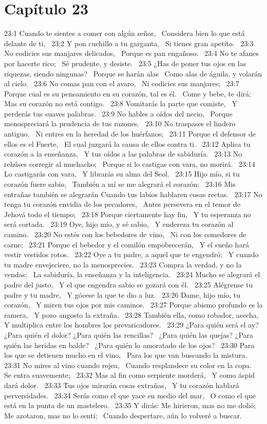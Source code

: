 \section*{Capítulo 23 }

23:1 Cuando te sientes a comer con algún señor,  
Considera bien lo que está delante de ti,  
23:2 Y pon cuchillo a tu garganta,  
Si tienes gran apetito.  
23:3 No codicies sus manjares delicados,  
Porque es pan engañoso.  
23:4 No te afanes por hacerte rico;  
Sé prudente, y desiste.  
23:5 ¿Has de poner tus ojos en las riquezas, siendo ningunas?  
Porque se harán alas  
Como alas de águila, y volarán al cielo.  
23:6 No comas pan con el avaro,  
Ni codicies sus manjares;  
23:7 Porque cual es su pensamiento en su corazón, tal es él.  
Come y bebe, te dirá;  
Mas su corazón no está contigo.  
23:8 Vomitarás la parte que comiste,  
Y perderás tus suaves palabras.  
23:9 No hables a oídos del necio,  
Porque menospreciará la prudencia de tus razones.  
23:10 No traspases el lindero antiguo,  
Ni entres en la heredad de los huérfanos;  
23:11 Porque el defensor de ellos es el Fuerte,  
El cual juzgará la causa de ellos contra ti.  
23:12 Aplica tu corazón a la enseñanza,  
Y tus oídos a las palabras de sabiduría.  
23:13 No rehúses corregir al muchacho;  
Porque si lo castigas con vara, no morirá.  
23:14 Lo castigarás con vara,  
Y librarás su alma del Seol.  
23:15 Hijo mío, si tu corazón fuere sabio,  
También a mí se me alegrará el corazón;  
23:16 Mis entrañas también se alegrarán 
Cuando tus labios hablaren cosas rectas.  
23:17 No tenga tu corazón envidia de los pecadores,  
Antes persevera en el temor de Jehová todo el tiempo;  
23:18 Porque ciertamente hay fin,  
Y tu esperanza no será cortada.  
23:19 Oye, hijo mío, y sé sabio,  
Y endereza tu corazón al camino.  
23:20 No estés con los bebedores de vino,  
Ni con los comedores de carne;  
23:21 Porque el bebedor y el comilón empobrecerán,  
Y el sueño hará vestir vestidos rotos.  
23:22 Oye a tu padre, a aquel que te engendró;  
Y cuando tu madre envejeciere, no la menosprecies.  
23:23 Compra la verdad, y no la vendas;  
La sabiduría, la enseñanza y la inteligencia.  
23:24 Mucho se alegrará el padre del justo,  
Y el que engendra sabio se gozará con él.  
23:25 Alégrense tu padre y tu madre,  
Y gócese la que te dio a luz.  
23:26 Dame, hijo mío, tu corazón,  
Y miren tus ojos por mis caminos.  
23:27 Porque abismo profundo es la ramera,  
Y pozo angosto la extraña.  
23:28 También ella, como robador, acecha,  
Y multiplica entre los hombres los prevaricadores.  
23:29 ¿Para quién será el ay? ¿Para quién el dolor? ¿Para quién las rencillas?  
¿Para quién las quejas? ¿Para quién las heridas en balde?  
¿Para quién lo amoratado de los ojos?  
23:30 Para los que se detienen mucho en el vino,  
Para los que van buscando la mistura.  
23:31 No mires al vino cuando rojea,  
Cuando resplandece su color en la copa.  
Se entra suavemente;  
23:32 Mas al fin como serpiente morderá,  
Y como áspid dará dolor.  
23:33 Tus ojos mirarán cosas extrañas,  
Y tu corazón hablará perversidades.  
23:34 Serás como el que yace en medio del mar,  
O como el que está en la punta de un mastelero.  
23:35 Y dirás: Me hirieron, mas no me dolió;  
Me azotaron, mas no lo sentí;  
Cuando despertare, aún lo volveré a buscar.  
